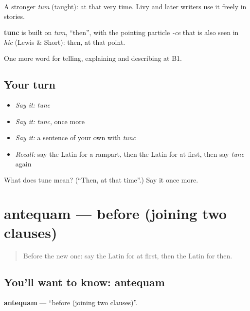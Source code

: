 A stronger \emph{tum} (taught): at that very time. Livy and later writers use it freely in stories.

\begin{cousinweb}
\textbf{tunc} is built on \emph{tum}, \textquotedblleft{}then\textquotedblright{}, with the pointing particle \emph{-ce} that is also seen in \emph{hic} (Lewis \& Short): then, at that point.
\end{cousinweb}

\begin{grammarlens}[title={What you've built}]
One more word for telling, explaining and describing at B1.
\end{grammarlens}

\subsection*{Your turn}
\begin{itemize}
\raggedright
  \item \emph{Say it:} \emph{tunc}
  \item \emph{Say it:} \emph{tunc}, once more
  \item \emph{Say it:} a sentence of your own with \emph{tunc}
  \item \emph{Recall:} say the Latin for a rampart, then the Latin for at first, then say \emph{tunc} again
\end{itemize}

\begin{tcolorbox}[breakable,colback=teal!4,colframe=teal!35!black,title={Before you move on}]
What does tunc mean? (\textquotedblleft{}Then, at that time\textquotedblright{}.) Say it once more.
\end{tcolorbox}
\section[antequam]{antequam — before (joining two clauses)}

\label{lesson:LA-C291-antequam}



\begin{quote}
Before the new one: say the Latin for at first, then the Latin for then.
\end{quote}

\subsection*{You'll want to know: antequam}
\textbf{antequam} — \textquotedblleft{}before (joining two clauses)\textquotedblright{}.

